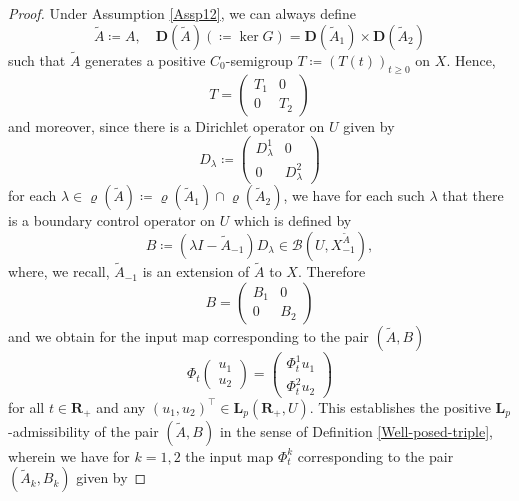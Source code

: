 \documentclass[a4paper,11pt,reqno]{amsart}
\def\la{\lambda}
\def\calB{{\calB}}
\def\calB{{\mathcal{B}}}
\def\R{\mathbf{R}}
\theoremstyle{plain}
\numberwithin{equation}{section}
\begin{document}
\begin{proof}
Under Assumption \ref{Assp12}, we can always define
\begin{equation}\label{restriction-operator}
\tilde{A}\coloneqq A,\quad \bm{D}(\tilde{A})\left(\coloneqq \ker G\right)= \bm{D}(\tilde{A}_1)\times \bm{D}(\tilde{A}_2)
\end{equation}
such that $\tilde{A}$ generates a positive $C_0$-semigroup $T\coloneqq \left(T(t)\right)_{t\geq0}$ on $X$. Hence,
\begin{equation*}
T=\left(\begin{matrix}
T_1 & 0 \\
0 & T_2
\end{matrix}\right)
\end{equation*}
and moreover, since there is a Dirichlet operator on $U$ given by
\begin{equation*}
D_\la\coloneqq\left(\begin{matrix}
D_\la^{1} & 0 \\
0 & D_\la^{2}
\end{matrix}\right)
\end{equation*}
for each $\la \in \varrho(\tilde{A})\coloneqq\varrho(\tilde{A}_1)\cap \varrho(\tilde{A}_2)$, we have for each such $\la$ that there is a boundary control operator on $U$ which is defined by
\begin{equation*}
B\coloneqq (\la I-\tilde{A}_{-1})D_\la\in \calB(U, X_{-1}^{\tilde{A}}),
\end{equation*}
where, we recall, $\tilde{A}_{-1}$ is an extension of $\tilde{A}$ to $X$. Therefore
\begin{equation*}
B=\left(\begin{matrix}
B_1 & 0 \\
0 & B_2
\end{matrix}\right)
\end{equation*}
and we obtain for the input map corresponding to the pair $(\tilde{{A}}, {B})$
\begin{equation}\label{input-maps}
\Phi_{t}\left(\begin{matrix}
u_1\\
u_2
\end{matrix}\right)=\left(\begin{matrix}
\Phi_{t}^1u_1\\
\Phi_{t}^2u_2
\end{matrix}\right)
\end{equation}
for all $t\in\R_+$ and any $(u_1,u_2)^\top\in \bm{L}_p(\R_+, U)$. This establishes the positive $\bm{L}_p$-admissibility of the pair $(\tilde{A},B)$ in the sense of Definition \ref{Well-posed-triple}, wherein we have for $k=1,2$ the input map $\Phi_{t}^k$ corresponding to the pair $(\tilde{A}_k,B_k)$ given by

\end{proof}
\end{document}

